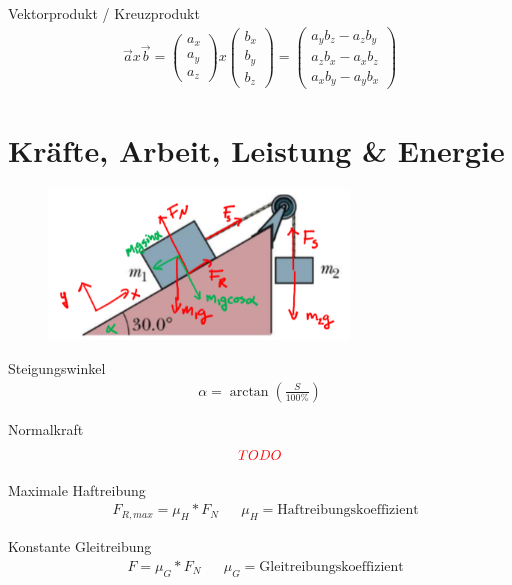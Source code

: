 \documentclass[17pt]{extarticle}
\begin{document}
	Vektorprodukt / Kreuzprodukt
	\begin{align}
		\vec{a} x \vec{b} = 
		\begin{pmatrix} a_x \\ a_y \\ a_z \end{pmatrix}
		x
		\begin{pmatrix} b_x \\ b_y \\ b_z \end{pmatrix}
		=
		\begin{pmatrix} a_y b_z - a_z b_y \\ a_z b_x - a_x b_z \\ a_x b_y - a_y b_x \end{pmatrix}
	\end{align}
	
\section{Kräfte, Arbeit, Leistung \& Energie}
	\begin{figure}[h!]
		\centering
		\includegraphics[width=8cm]{img/Haftreibung.png}
	\end{figure}

	Steigungswinkel
	\begin{align}
		\alpha = \arctan(\frac{S}{100\%}) 
	\end{align}
	
	Normalkraft
	\begin{align}
		\textcolor{red}{TODO}
	\end{align}
	
	Maximale Haftreibung
	\begin{align}
		&F_{R,max} = \mu_{H} * F_{N}
		&&\mu_{H} = \text{Haftreibungskoeffizient} 
	\end{align}

	Konstante Gleitreibung
	\begin{align}
		&F = \mu_{G} * F_{N}
		&&\mu_{G} = \text{Gleitreibungskoeffizient}		
	\end{align}
\end{document}
